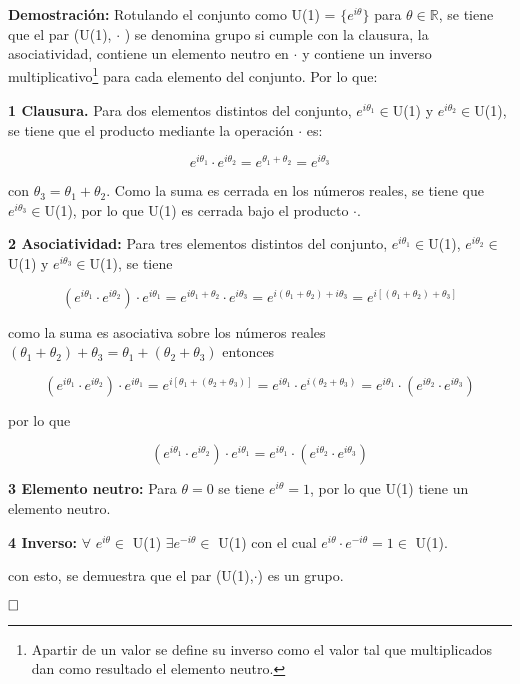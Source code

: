{\setlength{\parindent}{0 pt} \textbf{Demostración:} Rotulando el conjunto como U(1) = $\{e^{i\theta}\}$ para $\theta \in \mathbb{R}$, se tiene que el par (U(1), $\cdot$ ) se denomina grupo si cumple con la clausura, la asociatividad, contiene un elemento neutro en $\cdot$ y contiene un inverso multiplicativo\footnote{Apartir de un valor se define su inverso como el valor tal que multiplicados dan como resultado el elemento neutro.} para cada elemento del conjunto. Por lo que:}

\textbf{1 Clausura.} Para dos elementos distintos del conjunto, $e^{i\theta_1}\in $U(1) y $e^{i\theta_2}\in $U(1), se tiene que el producto mediante la operación $\cdot$ es:

$$ e^{i\theta_1} \cdot e^{i\theta_2} = e^{\theta_1 + \theta_2} = e^{i\theta_3} $$

con $\theta_3 = \theta_1 + \theta_2$. Como la suma es cerrada en los números reales, se tiene que $e^{i\theta_3}\in $U(1), por lo que U(1) es cerrada bajo el producto $\cdot$.

\textbf{2 Asociatividad:} Para tres elementos distintos del conjunto, $e^{i\theta_1}\in $U(1), $e^{i\theta_2}\in $U(1) y $e^{i\theta_3}\in $U(1), se tiene

$$ (e^{i\theta_1}\cdot e^{i\theta_2})\cdot e^{i\theta_1} = e^{i\theta_1+\theta_2}\cdot e^{i\theta_3} = e^{i(\theta_1+\theta_2)+i\theta_3} = e^{i[(\theta_1+\theta_2)+\theta_3]} $$

como la suma es asociativa sobre los números reales $(\theta_1+\theta_2)+\theta_3 = \theta_1+(\theta_2+\theta_3)$ entonces

$$ (e^{i\theta_1}\cdot e^{i\theta_2})\cdot e^{i\theta_1} = e^{i[\theta_1+(\theta_2+\theta_3)]} = e^{i\theta_1}\cdot e^{i(\theta_2+\theta_3)} = e^{i\theta_1}\cdot (e^{i\theta_2}\cdot e^{i\theta_3}) $$

por lo que 

$$ (e^{i\theta_1}\cdot e^{i\theta_2})\cdot e^{i\theta_1} = e^{i\theta_1}\cdot (e^{i\theta_2}\cdot e^{i\theta_3}) $$

\textbf{3 Elemento neutro:} Para $\theta = 0$ se tiene $e^{i\theta}=1$, por lo que U(1) tiene un elemento neutro.

\textbf{4 Inverso:} $\forall$ $e^{i\theta}\in$ U(1) $\exists e^{-i\theta}\in$ U(1) con el cual $e^{i\theta}\cdot e^{-i\theta} = 1\in$ U(1).

con esto, se demuestra que el par (U(1),$\cdot$) es un grupo.

\raggedright
$\hfill\square$
\raggedright

